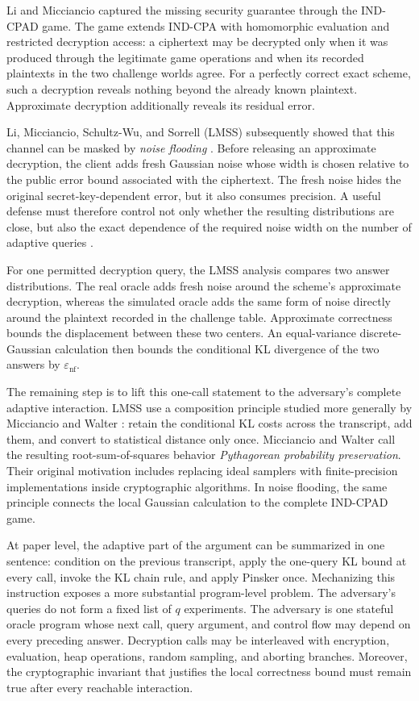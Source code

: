 Li and Micciancio captured the missing security guarantee through the IND-CPAD game. The game extends IND-CPA with homomorphic evaluation and restricted decryption access: a ciphertext may be decrypted only when it was produced through the legitimate game operations and when its recorded plaintexts in the two challenge worlds agree. For a perfectly correct exact scheme, such a decryption reveals nothing beyond the already known plaintext. Approximate decryption additionally reveals its residual error.

Li, Micciancio, Schultz-Wu, and Sorrell (LMSS) subsequently showed that this channel can be masked by \emph{noise flooding} \cite{lmss}. Before releasing an approximate decryption, the client adds fresh Gaussian noise whose width is chosen relative to the public error bound associated with the ciphertext. The fresh noise hides the original secret-key-dependent error, but it also consumes precision. A useful defense must therefore control not only whether the resulting distributions are close, but also the exact dependence of the required noise width on the number of adaptive queries \cite{costache2023precision,bergamaschi2025revisiting}.

For one permitted decryption query, the LMSS analysis compares two answer distributions. The real oracle adds fresh noise around the scheme's approximate decryption, whereas the simulated oracle adds the same form of noise directly around the plaintext recorded in the challenge table. Approximate correctness bounds the displacement between these two centers. An equal-variance discrete-Gaussian calculation then bounds the conditional KL divergence of the two answers by $\varepsilon_{\mathrm{nf}}$.

The remaining step is to lift this one-call statement to the adversary's complete adaptive interaction. LMSS use a composition principle studied more generally by Micciancio and Walter \cite{mw17}: retain the conditional KL costs across the transcript, add them, and convert to statistical distance only once. Micciancio and Walter call the resulting root-sum-of-squares behavior \emph{Pythagorean probability preservation}. Their original motivation includes replacing ideal samplers with finite-precision implementations inside cryptographic algorithms. In noise flooding, the same principle connects the local Gaussian calculation to the complete IND-CPAD game.

At paper level, the adaptive part of the argument can be summarized in one sentence: condition on the previous transcript, apply the one-query KL bound at every call, invoke the KL chain rule, and apply Pinsker once. Mechanizing this instruction exposes a more substantial program-level problem. The adversary's queries do not form a fixed list of $q$ experiments. The adversary is one stateful oracle program whose next call, query argument, and control flow may depend on every preceding answer. Decryption calls may be interleaved with encryption, evaluation, heap operations, random sampling, and aborting branches. Moreover, the cryptographic invariant that justifies the local correctness bound must remain true after every reachable interaction.

